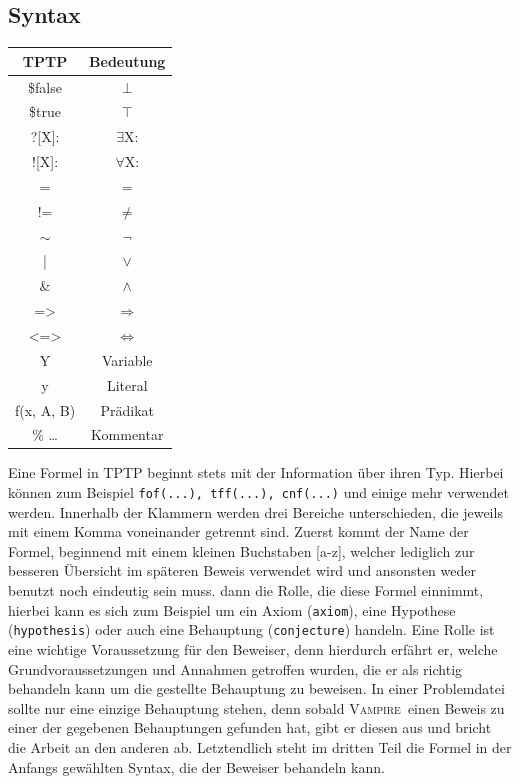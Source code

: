 \documentclass{article}
\newcommand{\vampire}{\textsc{Vampire}~}
\begin{document}
\subsection{Syntax}
\label{subsec:syntax}
\begin{table}
\begin{tabular}{|c|c|}
	\hline TPTP & Bedeutung \\ 
	\hline \$false & $\bot$\\
	\hline \$true & $\top$\\
	\hline ?[X]: & $\exists$X: \\
	\hline ![X]: & $\forall$X: \\
	\hline = & = \\
	\hline != & $\neq$ \\
	\hline $\sim$ & $\lnot$ \\
	\hline | & $\lor$ \\
	\hline \& & $\land$ \\
	\hline => & $\Rightarrow$ \\
	\hline <=> & $\Leftrightarrow$ \\
	\hline Y & Variable \\
	\hline y & Literal \\
	\hline f(x, A, B) & Prädikat \\
	\hline \% \dots & Kommentar \\
	\hline
\end{tabular} 
\end{table}
Eine Formel in TPTP beginnt stets mit der Information über ihren Typ. Hierbei können zum Beispiel \texttt{fof(...), tff(...), cnf(...)} und einige mehr verwendet werden.
Innerhalb der Klammern werden drei Bereiche unterschieden, die jeweils mit einem Komma voneinander getrennt sind. 
Zuerst kommt der Name der Formel, beginnend mit einem kleinen Buchstaben [a-z], welcher lediglich zur besseren Übersicht im späteren Beweis verwendet wird und ansonsten weder benutzt noch eindeutig sein muss.
dann die Rolle, die diese Formel einnimmt, hierbei kann es sich zum Beispiel um ein Axiom (\texttt{axiom}), eine Hypothese (\texttt{hypothesis}) oder auch eine Behauptung (\texttt{conjecture}) handeln.
Eine Rolle ist eine wichtige Voraussetzung für den Beweiser, denn hierdurch erfährt er, welche Grundvoraussetzungen und Annahmen getroffen wurden, die er als richtig behandeln kann um die gestellte Behauptung zu beweisen.
In einer Problemdatei sollte nur eine einzige Behauptung stehen, denn sobald \vampire einen Beweis zu einer der gegebenen Behauptungen gefunden hat, gibt er diesen aus und bricht die Arbeit an den anderen ab.
Letztendlich steht im dritten Teil die Formel in der Anfangs gewählten Syntax, die der Beweiser behandeln kann. \cite[S. 4-5]{cav2013}
\end{document}
